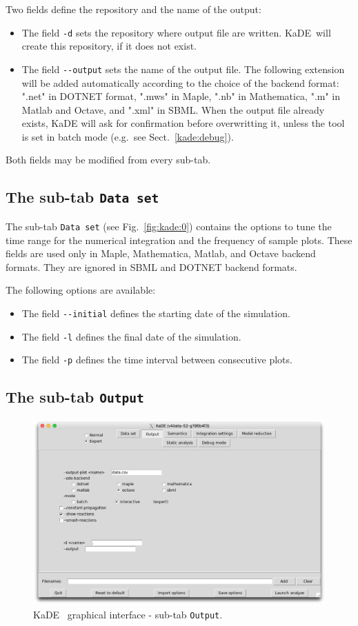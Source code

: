 \documentclass[11pt]{book}
\def\KaDE{\textsf{KaDE}}
\begin{document}
Two fields define the repository and the name of the output:
\begin{itemize}
\item The field \texttt{-d} sets  the repository where output file are written. \KaDE~will create this repository, if it does not exist.
\item The field \texttt{-{}-output} sets the name of the output file.
The following extension will be added automatically according to the choice of the backend format: ".net" in DOTNET format, ".mws" in Maple, ".nb" in Mathematica, ".m" in Matlab and Octave, and ".xml" in SBML. When the output file already exists, {\KaDE} will ask for confirmation before overwritting it, unless the tool is set in batch mode (e.g.~see Sect.~\ref{kade:debug}).
\end{itemize}
Both fields may be modified from every sub-tab.




\subsection{The sub-tab \texttt{Data set}}

The sub-tab \texttt{Data set} (see Fig.~\ref{fig:kade:0}) contains the options to tune the time range for the numerical integration and the frequency of sample plots. These fields are used only in Maple, Mathematica, Matlab, and Octave backend formats.
They are ignored in SBML and DOTNET backend formats.

The following options are available:
\begin{itemize}
\item The field \texttt{-{}-initial} defines the starting date of the simulation.
\item The field \texttt{-l} defines the final date of the simulation.
\item The field \texttt{-p} defines the time interval between consecutive plots.
\end{itemize}

\subsection{The sub-tab \texttt{Output}}

\begin{figure}[htbp]
\centering
\includegraphics[width=12cm,bb=0 0 1904 1208]{img/kade_1.png}
\caption{\KaDE~ graphical interface - sub-tab \texttt{Output}.}
\label{fig:kade:1}
\end{figure}
\end{document}

